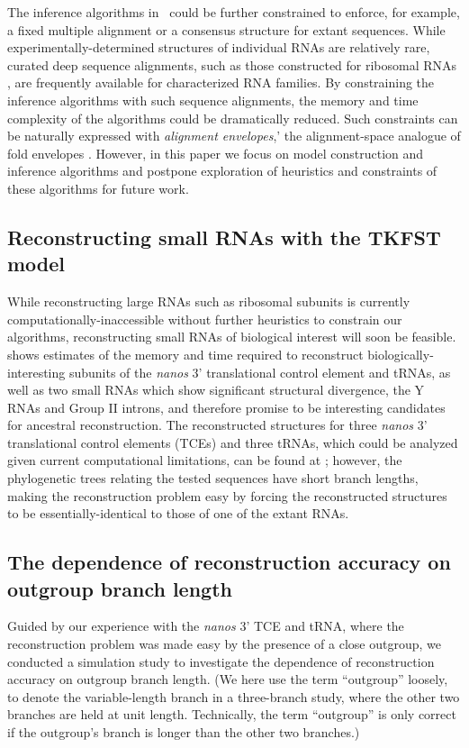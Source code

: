 \documentclass[10pt]{article}
\begin{document}
The inference algorithms in \indiegram\ could be further constrained
to enforce, for example, a fixed multiple alignment or a consensus
structure for extant sequences.  While experimentally-determined
structures of individual RNAs are relatively rare, curated deep sequence
alignments, such as those constructed for ribosomal RNAs
\cite{Gutell93}, are frequently available for characterized RNA families.  By constraining the
inference algorithms with such sequence alignments, the memory and
time complexity of the algorithms could be dramatically reduced.  Such
constraints can be naturally expressed with {\em alignment envelopes},'
the alignment-space analogue of fold envelopes \cite{Holmes2005}.
However, in this paper we focus on model construction and inference
algorithms and postpone exploration of heuristics and constraints of
these algorithms for future work.


\subsection*{Reconstructing small RNAs with the TKFST model}

While reconstructing large RNAs such as ribosomal subunits is
currently computationally-inaccessible without further heuristics to
constrain our algorithms, reconstructing small RNAs of biological
interest will soon be feasible.
 shows estimates of the memory and time required
to reconstruct biologically-interesting subunits of 
the \emph{nanos} 3' translational control element and tRNAs,
as well as two small RNAs which show significant structural
divergence, the Y RNAs and Group II introns, and therefore promise to be
interesting candidates for ancestral reconstruction.
The reconstructed structures for three \emph{nanos} 3'
translational control elements (TCEs) and three tRNAs, which could be
analyzed given current computational limitations, can be found at
\indiegramurl; however, the phylogenetic trees relating the tested
sequences have short branch lengths, making the reconstruction problem easy by forcing the reconstructed structures to
be essentially-identical to those of one of the extant RNAs.


\subsection*{The dependence of reconstruction accuracy on outgroup
  branch length}

Guided by our experience with the \emph{nanos} 3' TCE and tRNA, where
the reconstruction problem was made easy by the presence of a close
outgroup, we conducted a simulation study to investigate the
dependence of reconstruction accuracy on outgroup branch length.
(We here use the term ``outgroup'' loosely, to denote the variable-length branch in a three-branch study,
where the other two branches are held at unit length.
Technically, the term ``outgroup'' is only correct if the outgroup's branch is longer than the other two branches.)
\end{document}
